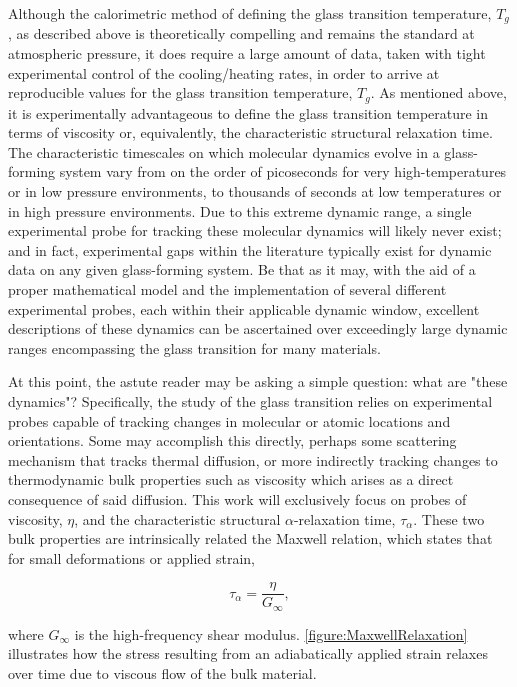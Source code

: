 Although the calorimetric method of defining the glass transition temperature, $T_g$, as described above is theoretically compelling and remains the standard at atmospheric pressure, it does require a large amount of data, taken with tight experimental control of the cooling/heating rates, in order to arrive at reproducible values for the glass transition temperature, $T_g$. As mentioned above, it is experimentally advantageous to define the glass transition temperature in terms of viscosity or, equivalently, the characteristic structural relaxation time.  The characteristic timescales on which molecular dynamics evolve in a glass-forming system vary from on the order of picoseconds for very high-temperatures or in low pressure environments, to thousands of seconds at low temperatures or in high pressure environments. Due to this extreme dynamic range, a single experimental probe for tracking these molecular dynamics will likely never exist; and in fact, experimental gaps within the literature typically exist for dynamic data on any given glass-forming system.  Be that as it may, with the aid of a proper mathematical model and the implementation of several different experimental probes, each within their applicable dynamic window, excellent descriptions of these dynamics can be ascertained over exceedingly large dynamic ranges encompassing the glass transition for many materials.  

At this point, the astute reader may be asking a simple question: what are "these dynamics"?   Specifically, the study of the glass transition relies on experimental probes capable of tracking changes in molecular or atomic locations and orientations.  Some may accomplish this directly, perhaps \via some scattering mechanism that tracks thermal diffusion, or more indirectly \via tracking changes to thermodynamic bulk properties such as viscosity which arises as a direct consequence of said diffusion. This work will exclusively  focus on probes of viscosity, $\eta$, and the characteristic structural $\alpha$-relaxation time, $\tau_{\alpha}$.  These two bulk properties are intrinsically related \via the Maxwell relation, which states that for small deformations or applied strain,

\begin{equation}
	\tau_{\alpha} = \frac{\eta}{G_{\infty}},
	\label{eq:MaxwellRelation}
\end{equation}

\noindent where $G_{\infty}$ is the high-frequency shear modulus.  \fig \nolinebreak \ref{figure:MaxwellRelaxation} illustrates how the stress resulting from an adiabatically applied strain relaxes over time due to viscous flow of the bulk material. 

